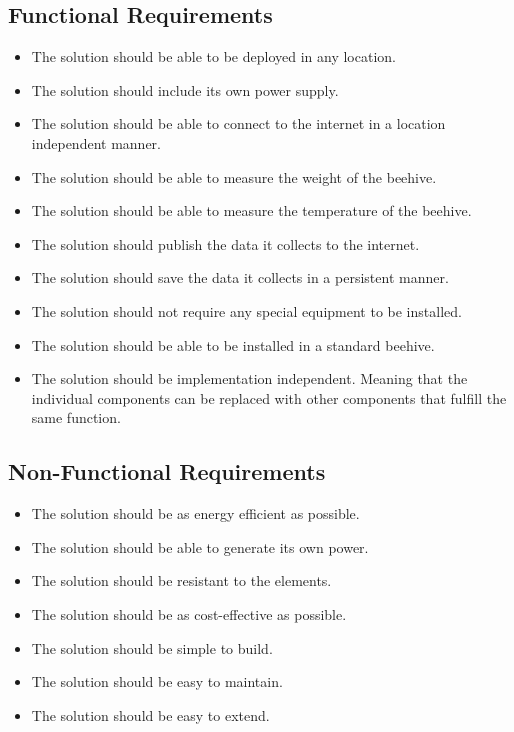 \subsection{Functional Requirements}
\begin{itemize}
    \item The solution should be able to be deployed in any location.
    \item The solution should include its own power supply.
    \item The solution should be able to connect to the internet in a location independent manner.
    \item The solution should be able to measure the weight of the beehive.
    \item The solution should be able to measure the temperature of the beehive.
    \item The solution should publish the data it collects to the internet.
    \item The solution should save the data it collects in a persistent manner.
    \item The solution should not require any special equipment to be installed.
    \item The solution should be able to be installed in a standard beehive.
    \item The solution should be implementation independent. Meaning that the individual components can be replaced with other components that fulfill the same function.
\end{itemize}
\subsection{Non-Functional Requirements}
\begin{itemize}
    \item The solution should be as energy efficient as possible.
    \item The solution should be able to generate its own power.
    \item The solution should be resistant to the elements.
    \item The solution should be as cost-effective as possible.
    \item The solution should be simple to build.
    \item The solution should be easy to maintain.
    \item The solution should be easy to extend.
\end{itemize}

